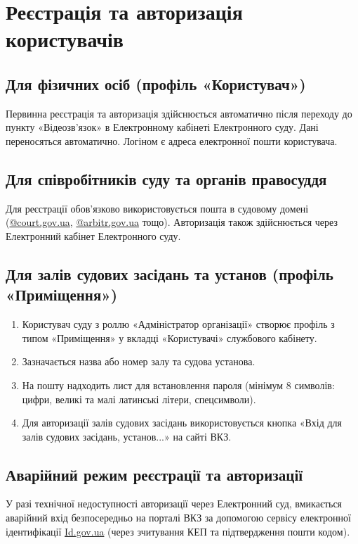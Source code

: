 \documentclass{article}
\begin{document}
\newpage

\section{Реєстрація та авторизація користувачів}

\subsection{Для фізичних осіб (профіль «Користувач»)}
Первинна реєстрація та авторизація здійснюється автоматично після переходу до пункту «Відеозв’язок» в Електронному кабінеті Електронного суду. Дані переносяться автоматично. Логіном є адреса електронної пошти користувача.

\subsection{Для співробітників суду та органів правосуддя}
Для реєстрації обов'язково використовується пошта в судовому домені (\url{@court.gov.ua}, \url{@arbitr.gov.ua} тощо). Авторизація також здійснюється через Електронний кабінет Електронного суду.

\subsection{Для залів судових засідань та установ (профіль «Приміщення»)}
\begin{enumerate}
    \item Користувач суду з роллю «Адміністратор організації» створює профіль з типом «Приміщення» у вкладці «Користувачі» службового кабінету.
    \item Зазначається назва або номер залу та судова установа.
    \item На пошту надходить лист для встановлення пароля (мінімум 8 символів: цифри, великі та малі латинські літери, спецсимволи).
    \item Для авторизації залів судових засідань використовується кнопка «Вхід для залів судових засідань, установ...» на сайті ВКЗ.
\end{enumerate}

\subsection{Аварійний режим реєстрації та авторизації}
У разі технічної недоступності авторизації через Електронний суд, вмикається аварійний вхід безпосередньо на порталі ВКЗ за допомогою сервісу електронної ідентифікації \url{Id.gov.ua} (через зчитування КЕП та підтвердження пошти кодом).
\end{document}
